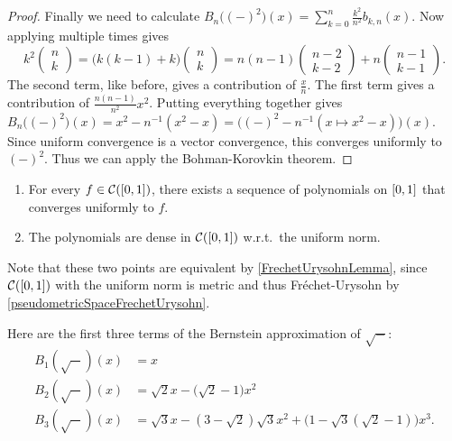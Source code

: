 \begin{proof}
Finally we need to calculate $B_n\big((-)^2\big)(x) = \sum_{k=0}^n \frac{k^2}{n^2}b_{k,n}(x)$. Now applying multiple times gives
\[ k^2 \begin{pmatrix}
n \\ k
\end{pmatrix} = \big(k(k-1) + k\big)\begin{pmatrix}
n \\ k
\end{pmatrix} = n(n-1) \begin{pmatrix}
n - 2 \\ k - 2
\end{pmatrix} + n \begin{pmatrix}
n-1 \\ k-1
\end{pmatrix}. \]
The second term, like before, gives a contribution of $\frac{x}{n}$. The first term gives a contribution of $\frac{n(n-1)}{n^2}x^2$. Putting everything together gives $B_n\big((-)^2\big)(x) = x^2 - n^{-1}(x^2-x) = \big((-)^2 - n^{-1}(x\mapsto x^2 - x)\big)(x)$. Since uniform convergence is a vector convergence, this converges uniformly to $(-)^2$. Thus we can apply the Bohman-Korovkin theorem.
\end{proof}
\begin{corollary} \label{WeierstrassApproximationTheorem}
\begin{enumerate}
\item For every $f\in \cont(\interval{0,1})$, there exists a sequence of polynomials on $\interval{0,1}$ that converges uniformly to $f$.
\item The polynomials are dense in $\cont(\interval{0,1})$ w.r.t.\ the uniform norm.
\end{enumerate}
\end{corollary}
Note that these two points are equivalent by \ref{FrechetUrysohnLemma}, since $\cont(\interval{0,1})$ with the uniform norm is metric and thus Fréchet-Urysohn by \ref{pseudometricSpaceFrechetUrysohn}.

\begin{example}
Here are the first three terms of the Bernstein approximation of $\sqrt{-}$:
\begin{align*}
B_1(\sqrt{-})(x) &= x \\
B_2(\sqrt{-})(x) &= \sqrt{2}x - \big(\sqrt{2}-1\big)x^2 \\
B_3(\sqrt{-})(x) &= \sqrt{3}x - (3-\sqrt{2})\sqrt{3}x^2 + \big(1 - \sqrt{3}(\sqrt{2}-1)\big)x^3.
\end{align*}
\end{example}

